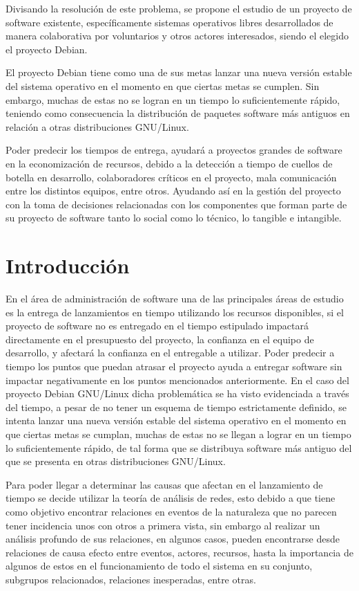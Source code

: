 \documentclass[12pt,titlepage]{report}
\begin{document}
Divisando la resolución de este problema,  se propone el estudio de un
proyecto  de software  existente, específicamente  sistemas operativos
libres desarrollados  de manera  colaborativa por voluntarios  y otros
actores interesados, siendo el elegido el proyecto Debian.

El  proyecto Debian  tiene  como una  de sus  metas  lanzar una  nueva
versión estable  del sistema  operativo en el  momento en  que ciertas
metas se  cumplen.  Sin embargo,  muchas de estas  no se logran  en un
tiempo  lo  suficientemente  rápido,  teniendo  como  consecuencia  la
distribución de  paquetes software  más antiguos  en relación  a otras
distribuciones GNU/Linux.

Poder predecir los tiempos de  entrega, ayudará a proyectos grandes de
software  en la  economización de  recursos, debido  a la  detección a
tiempo de cuellos de botella  en desarrollo, colaboradores críticos en
el  proyecto, mala  comunicación  entre los  distintos equipos,  entre
otros.   Ayudando así  en  la  gestión del  proyecto  con  la toma  de
decisiones relacionadas  con los  componentes que  forman parte  de su
proyecto de  software tanto lo social  como lo técnico, lo  tangible e
intangible.

\section{Introducción}
En el área de administración de  software una de las principales áreas
de  estudio es  la entrega  de lanzamientos  en tiempo  utilizando los
recursos disponibles, si el proyecto de software no es entregado en el
tiempo  estipulado  impactará  directamente   en  el  presupuesto  del
proyecto,  la confianza  en el  equipo  de desarrollo,  y afectará  la
confianza en  el entregable  a utilizar. Poder  predecir a  tiempo los
puntos que  puedan atrasar el  proyecto ayuda a entregar  software sin
impactar negativamente en los puntos mencionados anteriormente.  En el
caso  del proyecto  Debian GNU/Linux  dicha problemática  se ha  visto
evidenciada a  través del tiempo,  a pesar de  no tener un  esquema de
tiempo  estrictamente definido,  se intenta  lanzar una  nueva versión
estable del  sistema operativo en el  momento en que ciertas  metas se
cumplan,  muchas de  estas  no se  llegan  a lograr  en  un tiempo  lo
suficientemente rápido,  de tal forma  que se distribuya  software más
antiguo del que se presenta en otras distribuciones GNU/Linux.

Para  poder  llegar  a  determinar   las  causas  que  afectan  en  el
lanzamiento  de tiempo  se decide  utilizar la  teoría de  análisis de
redes, esto debido  a que tiene como objetivo  encontrar relaciones en
eventos  de la  naturaleza que  no parecen  tener incidencia  unos con
otros a primera vista, sin embargo al realizar un análisis profundo de
sus relaciones, en algunos  casos, pueden encontrarse desde relaciones
de causa efecto entre eventos, actores, recursos, hasta la importancia
de algunos  de estos  en el  funcionamiento de todo  el sistema  en su
conjunto, subgrupos relacionados, relaciones inesperadas, entre otras.
\end{document}
